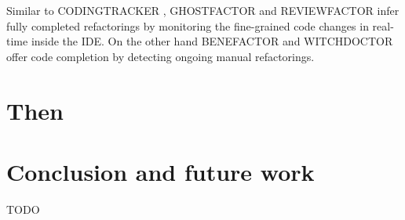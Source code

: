 \documentclass[letterpaper,12pt,onecolumn,final]{report}
\begin{document}
Similar to CODINGTRACKER \cite{Negara2013}, GHOSTFACTOR \cite{Ge2014} and REVIEWFACTOR \cite{Ge2017} infer fully completed refactorings by monitoring the fine-grained code changes in real-time inside the IDE. On the other hand BENEFACTOR \cite{Ge2012} and WITCHDOCTOR \cite{Foster2012} offer code completion by detecting ongoing manual refactorings.


\chapter{Then}


\chapter{Conclusion and future work}
\label{chap:conclusion}

TODO


\clearpage
{}
{}  %
\singlespacing %





\appendix
\setcounter{table}{0}		%
\setcounter{figure}{0}		%
\renewcommand{\thefigure}{\Alph{chapter}.\arabic{figure}} 	%
\renewcommand{\thetable}{\Alph{chapter}.\arabic{table}}		%
\end{document}
